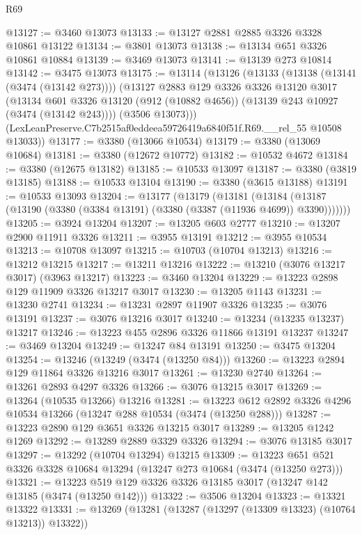 \begin{lexlean}{R69}
\begin{coremodule}
@13127 := @3460 @13073
@13133 := @13127 @2881 @2885 @3326 @3328 @10861 @13122
@13134 := @3801 @13073
@13138 := @13134 @651 @3326 @10861 @10884
@13139 := @3469 @13073
@13141 := @13139 @273 @10814
@13142 := @3475 @13073
@13175 := @13114
    (@13126
      (@13133
        (@13138 (@13141 (@3474 (@13142 @273))))
        (@13127
          @2883
          @129
          @3326
          @3326
          @13120
          @3017
          (@13134
            @601
            @3326
            @13120
            (@912 (@10882 @4656))
            (@13139 @243 @10927 (@3474 (@13142 @243))))
          (@3506 @13073)))
      (LexLeanPreserve.C7b2515af0eddeea59726419a6840f51f.R69.__rel_55 @10508 @13033))
@13177 := @3380 (@13066 @10534)
@13179 := @3380 (@13069 @10684)
@13181 := @3380 (@12672 @10772)
@13182 := @10532 @4672
@13184 := @3380 (@12675 @13182)
@13185 := @10533 @13097
@13187 := @3380 (@3819 @13185)
@13188 := @10533 @13104
@13190 := @3380 (@3615 @13188)
@13191 := @10533 @13093
@13204 := @13177
    (@13179
      (@13181
        (@13184 (@13187 (@13190 (@3380 (@3384 @13191) (@3380 (@3387 (@11936 @4699)) @3390)))))))
@13205 := @3924 @13204
@13207 := @13205 @603 @2777
@13210 := @13207 @2900 @11911 @3326
@13211 := @3955 @13191
@13212 := @3955 @10534
@13213 := @10708 @13097
@13215 := @10703 (@10704 @13213)
@13216 := @13212 @13215
@13217 := @13211 @13216
@13222 := @13210 (@3076 @13217 @3017) (@3963 @13217)
@13223 := @3460 @13204
@13229 := @13223 @2898 @129 @11909 @3326 @13217 @3017
@13230 := @13205 @1143
@13231 := @13230 @2741
@13234 := @13231 @2897 @11907 @3326
@13235 := @3076 @13191
@13237 := @3076 @13216 @3017
@13240 := @13234 (@13235 @13237) @13217
@13246 := @13223 @455 @2896 @3326 @11866 @13191 @13237
@13247 := @3469 @13204
@13249 := @13247 @84 @13191
@13250 := @3475 @13204
@13254 := @13246 (@13249 (@3474 (@13250 @84)))
@13260 := @13223 @2894 @129 @11864 @3326 @13216 @3017
@13261 := @13230 @2740
@13264 := @13261 @2893 @4297 @3326
@13266 := @3076 @13215 @3017
@13269 := @13264 (@10535 @13266) @13216
@13281 := @13223 @612 @2892 @3326 @4296 @10534 @13266 (@13247 @288 @10534 (@3474 (@13250 @288)))
@13287 := @13223 @2890 @129 @3651 @3326 @13215 @3017
@13289 := @13205 @1242 @1269
@13292 := @13289 @2889 @3329 @3326
@13294 := @3076 @13185 @3017
@13297 := @13292 (@10704 @13294) @13215
@13309 := @13223 @651 @521 @3326 @3328 @10684 @13294 (@13247 @273 @10684 (@3474 (@13250 @273)))
@13321 := @13223 @519 @129 @3326 @3326 @13185 @3017 (@13247 @142 @13185 (@3474 (@13250 @142)))
@13322 := @3506 @13204
@13323 := @13321 @13322
@13331 := @13269 (@13281 (@13287 (@13297 (@13309 @13323) (@10764 @13213)) @13322))

\end{coremodule}
\end{lexlean}

